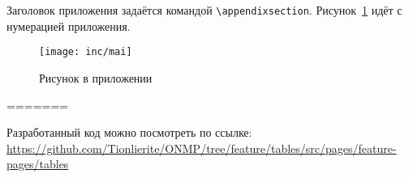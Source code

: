 
Заголовок приложения задаётся командой \texttt{\textbackslash appendixsection}. 
Рисунок~\ref{fig:a1} идёт с нумерацией приложения.

\begin{figure}
    \texttt{[image: inc/mai]}
    \caption{Рисунок в приложении}
    \label{fig:a1}
\end{figure}
=======

Разработанный код можно посмотреть по ссылке: \url{https://github.com/Tionlierite/ONMP/tree/feature/tables/src/pages/feature-pages/tables}

